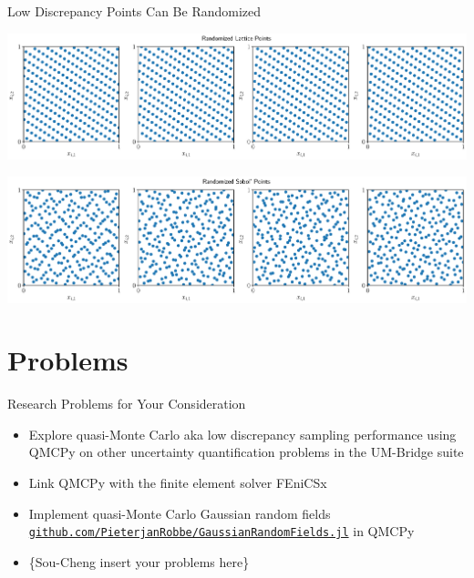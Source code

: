 \documentclass[10pt,compress,xcolor={usenames,dvipsnames},aspectratio=169]{beamer}
\begin{document}
\begin{frame}{Low Discrepancy Points Can Be Randomized}
	\vspace{-3.2ex}

	\includegraphics[width=\textwidth]{latticeptsrand.eps}

	\vspace{-4.3ex}

	\includegraphics[width=\textwidth]{sobolptsrand.eps}


\end{frame}

\section{Problems}

\begin{frame}{Research Problems for Your Consideration}
    \begin{itemize}
        \item Explore quasi-Monte Carlo aka low discrepancy sampling performance using QMCPy on other uncertainty quantification problems in the UM-Bridge suite 

        \item Link QMCPy with the finite element solver FEniCSx

        \item Implement quasi-Monte Carlo Gaussian random fields \href{https://github.com/PieterjanRobbe/GaussianRandomFields.jl}{\nolinkurl{github.com/PieterjanRobbe/GaussianRandomFields.jl}} in QMCPy 

        \item \{Sou-Cheng insert your problems here\}
        
    \end{itemize}
\end{frame}
\end{document}
